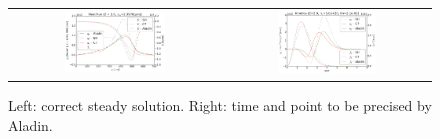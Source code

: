 \documentclass[preprint,12pt]{elsarticle}
\newcommand{\figscale}{0.5}
\begin{document}
\begin{figure}[tbh]
  \begin{center}
    \begin{tabular}{cc}
      \includegraphics[width=\figscale\textwidth]{../VFPdata/C7_Aladin_case1_heatflux.png} &
      \includegraphics[width=\figscale\textwidth]{../VFPdata/C7_Aladin_case1_kinetics.png}
    \end{tabular}
  \caption{  
  Left: correct steady solution. Right: time and point to be precised by Aladin.}
  \end{center}
  \label{fig:C7_Aladin_case1}
\end{figure}
\end{document}
